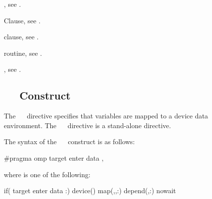\begin{crossrefs}
\item {}, see
.

\item {} Clause, see .

\item {} clause, see
.

\item {} routine, see .

\item {}, see
.

\end{crossrefs}



\subsection{~~ Construct}
\label{subsec:target enter data Construct}

\summary
The ~~ directive specifies that variables 
are mapped to a device data environment. The ~~ 
directive is a stand-alone directive.

\syntax

\begin{ccppspecific}
The syntax of the ~~ construct is as follows:
\begin{ompcPragma}
#pragma omp target enter data \plc{[ clause[ [},\plc{] clause]...] new-line}
\end{ompcPragma}
where  is one of the following:
\begin{indentedcodelist}
if(\plc{[} target enter data :\plc{] scalar-expression})
device()
map(\plc{[map-type-modifier[},\plc{] [map-type-modifier[},\plc{] ...] map-type}:)
depend(\plc{[depend-modifier},\plc{] dependence-type }:)
nowait
\end{indentedcodelist}
\end{ccppspecific}

